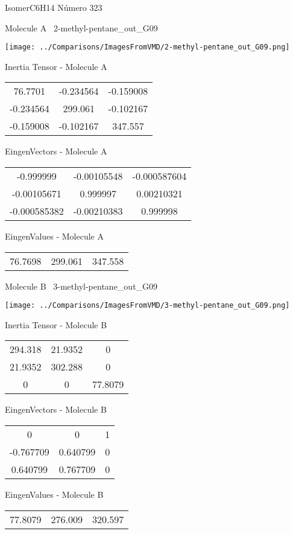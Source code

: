 \vtab[-3cm]
\begin{center}
{\large IsomerC6H14 \tab Número 323}
\end{center}
\begin{multicols}{2}
\begin{center}

Molecule A \
2-methyl-pentane\_out\_G09

\texttt{[image: ../Comparisons/ImagesFromVMD/2-methyl-pentane\_out\_G09.png]}

Inertia Tensor - Molecule A \\
\begin{tabular}{|c c c|}
76.7701	 & 	-0.234564	 & 	-0.159008	 \\
-0.234564	 & 	299.061	 & 	-0.102167	 \\
-0.159008	 & 	-0.102167	 & 	347.557
\end{tabular}

\vtab
 EingenVectors - Molecule A     \\
\begin{tabular}{|c c c|}
-0.999999	 & 	-0.00105548	 & 	-0.000587604	 \\
-0.00105671	 & 	0.999997	 & 	0.00210321	 \\
-0.000585382	 & 	-0.00210383	 & 	0.999998
\end{tabular}

\vtab
 EingenValues - Molecule A     \\
\begin{tabular}{|c c c|}
76.7698	 & 	299.061	 & 	347.558	 \\
\end{tabular}
\columnbreak

Molecule B \
3-methyl-pentane\_out\_G09

\texttt{[image: ../Comparisons/ImagesFromVMD/3-methyl-pentane\_out\_G09.png]}

Inertia Tensor - Molecule B \\
\begin{tabular}{|c c c|}
294.318	 & 	21.9352	 & 	0	 \\
21.9352	 & 	302.288	 & 	0	 \\
0	 & 	0	 & 	77.8079
\end{tabular}

\vtab
 EingenVectors - Molecule B     \\
\begin{tabular}{|c c c|}
0	 & 	0	 & 	1	 \\
-0.767709	 & 	0.640799	 & 	0	 \\
0.640799	 & 	0.767709	 & 	0
\end{tabular}

\vtab
 EingenValues - Molecule B     \\
\begin{tabular}{|c c c|}
77.8079	 & 	276.009	 & 	320.597	 \\
\end{tabular}

\end{center}
\end{multicols}

